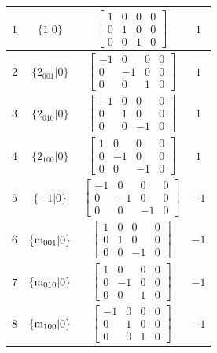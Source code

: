 \documentclass[fleqn,8pt]{jsarticle}
\begin{document}
\begin{longtable}{cccc}
$ 1 $ & $ \{1|0\} $ & $ \begin{bmatrix} 1 & 0 & 0 & 0 \\ 0 & 1 & 0 & 0 \\ 0 & 0 & 1 & 0 \end{bmatrix} $ & $ 1 $ \\ \hline
$ 2 $ & $ \{2{}_{001}|0\} $ & $ \begin{bmatrix} -1 & 0 & 0 & 0 \\ 0 & -1 & 0 & 0 \\ 0 & 0 & 1 & 0 \end{bmatrix} $ & $ 1 $ \\ \hline
$ 3 $ & $ \{2{}_{010}|0\} $ & $ \begin{bmatrix} -1 & 0 & 0 & 0 \\ 0 & 1 & 0 & 0 \\ 0 & 0 & -1 & 0 \end{bmatrix} $ & $ 1 $ \\ \hline
$ 4 $ & $ \{2{}_{100}|0\} $ & $ \begin{bmatrix} 1 & 0 & 0 & 0 \\ 0 & -1 & 0 & 0 \\ 0 & 0 & -1 & 0 \end{bmatrix} $ & $ 1 $ \\ \hline
$ 5 $ & $ \{-1|0\} $ & $ \begin{bmatrix} -1 & 0 & 0 & 0 \\ 0 & -1 & 0 & 0 \\ 0 & 0 & -1 & 0 \end{bmatrix} $ & $ -1 $ \\ \hline
$ 6 $ & $ \{{\rm m}_{001}|0\} $ & $ \begin{bmatrix} 1 & 0 & 0 & 0 \\ 0 & 1 & 0 & 0 \\ 0 & 0 & -1 & 0 \end{bmatrix} $ & $ -1 $ \\ \hline
$ 7 $ & $ \{{\rm m}_{010}|0\} $ & $ \begin{bmatrix} 1 & 0 & 0 & 0 \\ 0 & -1 & 0 & 0 \\ 0 & 0 & 1 & 0 \end{bmatrix} $ & $ -1 $ \\ \hline
$ 8 $ & $ \{{\rm m}_{100}|0\} $ & $ \begin{bmatrix} -1 & 0 & 0 & 0 \\ 0 & 1 & 0 & 0 \\ 0 & 0 & 1 & 0 \end{bmatrix} $ & $ -1 $ \\
\end{longtable}
\end{document}

